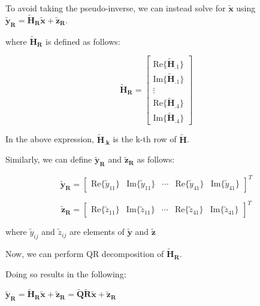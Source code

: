 \documentclass[fleqn]{article}
\begin{document}
\begin{enumerate}
\begin{enumerate}
			To avoid taking the pseudo-inverse, we can instead solve for $\mathbf{\tilde{x}}$ using $\mathbf{\tilde{y}_R} = \mathbf{\tilde{H}_R}\mathbf{\tilde{x}} + \mathbf{\tilde{z}_R}$.
			
			where $\mathbf{\tilde{H}_R}$ is defined as follows:
			
			\begin{equation*}
				\mathbf{\tilde{H}_R} = \begin{bmatrix}
					\text{Re}\{\mathbf{\tilde{H}_{.1}}\} \\
					\text{Im}\{\mathbf{\tilde{H}_{.1}}\} \\
					\vdots \\
					\text{Re}\{\mathbf{\tilde{H}_{.4}}\} \\
					\text{Im}\{\mathbf{\tilde{H}_{.4}}\}
				\end{bmatrix}
			\end{equation*}
			
			In the above expression, $\mathbf{\tilde{H}_{.k}}$ is the k-th row of $\mathbf{\tilde{H}}$.
			
			Similarly, we can define $\mathbf{\tilde{y}_R}$ and $\mathbf{\tilde{z}_R}$ as follows:
			
			\begin{equation*}
				\mathbf{\tilde{y}_R} = \begin{bmatrix}
					\text{Re}\{\tilde{y}_{11}\} & \text{Im}\{\tilde{y}_{11}\} & \cdots & \text{Re}\{\tilde{y}_{41}\} & \text{Im}\{\tilde{y}_{41}\}
				\end{bmatrix}^T
			\end{equation*}
			
			\begin{equation*}
				\mathbf{\tilde{z}_R} = \begin{bmatrix}
					\text{Re}\{\tilde{z}_{11}\} & \text{Im}\{\tilde{z}_{11}\} & \cdots & \text{Re}\{\tilde{z}_{41}\} & \text{Im}\{\tilde{z}_{41}\}
				\end{bmatrix}^T
			\end{equation*}
			
			where $\tilde{y}_{ij}$ and $\tilde{z}_{ij}$ are elements of $\mathbf{\tilde{y}}$ and $\mathbf{\tilde{z}}$
			
			Now, we can perform QR decomposition of $\mathbf{\tilde{H}_R}$.
			
			Doing so results in the following:
			
			$\mathbf{\tilde{y}_R} = \mathbf{\tilde{H}_R\tilde{x}} + \mathbf{\tilde{z}_R} = \mathbf{\tilde{Q}\tilde{R}\tilde{x}} + \mathbf{\tilde{z}_R}$
			

\end{enumerate}
\end{enumerate}
\end{document}
